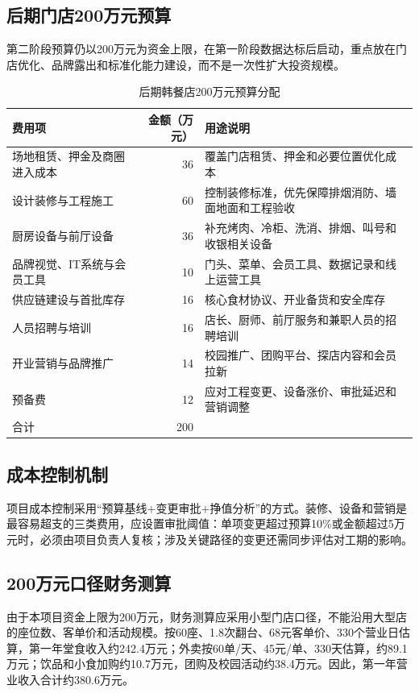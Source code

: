 \documentclass[UTF8,zihao=-4]{ctexart}
\begin{document}
\subsection{后期门店200万元预算}

第二阶段预算仍以200万元为资金上限，在第一阶段数据达标后启动，重点放在门店优化、品牌露出和标准化能力建设，而不是一次性扩大投资规模。

\begin{table}[H]
  \centering
  \caption{后期韩餐店200万元预算分配}
  \begin{tabularx}{\textwidth}{p{4cm}rY}
    \toprule
    费用项 & 金额（万元） & 用途说明 \\
    \midrule
    场地租赁、押金及商圈进入成本 & 36 & 覆盖门店租赁、押金和必要位置优化成本 \\
    设计装修与工程施工 & 60 & 控制装修标准，优先保障排烟消防、墙面地面和工程验收 \\
    厨房设备与前厅设备 & 36 & 补充烤肉、冷柜、洗消、排烟、叫号和收银相关设备 \\
    品牌视觉、IT系统与会员工具 & 10 & 门头、菜单、会员工具、数据记录和线上运营工具 \\
    供应链建设与首批库存 & 16 & 核心食材协议、开业备货和安全库存 \\
    人员招聘与培训 & 16 & 店长、厨师、前厅服务和兼职人员的招聘培训 \\
    开业营销与品牌推广 & 14 & 校园推广、团购平台、探店内容和会员拉新 \\
    预备费 & 12 & 应对工程变更、设备涨价、审批延迟和营销调整 \\
    \midrule
    合计 & 200 &  \\
    \bottomrule
  \end{tabularx}
\end{table}

\subsection{成本控制机制}

项目成本控制采用“预算基线+变更审批+挣值分析”的方式。装修、设备和营销是最容易超支的三类费用，应设置审批阈值：单项变更超过预算10\%或金额超过5万元时，必须由项目负责人复核；涉及关键路径的变更还需同步评估对工期的影响。

\subsection{200万元口径财务测算}

由于本项目资金上限为200万元，财务测算应采用小型门店口径，不能沿用大型店的座位数、客单价和活动规模。按60座、1.8次翻台、68元客单价、330个营业日估算，第一年堂食收入约242.4万元；外卖按60单/天、45元/单、330天估算，约89.1万元；饮品和小食加购约10.7万元，团购及校园活动约38.4万元。因此，第一年营业收入合计约380.6万元。
\end{document}
